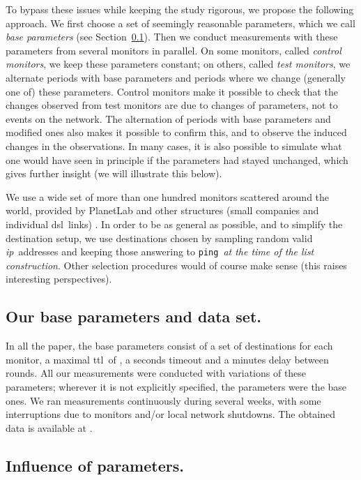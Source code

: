 \documentclass[times, 10pt,twocolumn]{article}
\newcommand{\ping}{{\tt ping}}
\newcommand{\ip}{\mbox{\em \sc ip}}
\newcommand{\ttl}{\mbox{\sc ttl}}
\newcommand{\dsl}{\mbox{\sc dsl}}
\begin{document}
To bypass these issues while keeping the study rigorous, we propose
the following approach. We first choose a set of seemingly reasonable
parameters, which we call {\em base parameters} (see
Section~\ref{sec_base}). Then we conduct measurements with these
parameters from several monitors in parallel.
On some monitors,
called {\em control monitors}, we keep these parameters constant;
on others, called {\em test monitors}, we alternate periods with base
parameters and periods where we change (generally one of) these
parameters.
Control monitors make it possible to check
that the changes observed from test monitors are due to changes of
parameters, not to events on the network. The alternation of periods
with base parameters and modified ones also makes it possible to
confirm this, and to observe the induced changes in the observations.
In many cases, it is also possible to simulate what one would have
seen in principle if the parameters had stayed unchanged, which gives
further insight (we will illustrate this below).

We use a wide set of more than one hundred monitors scattered around
the world, provided by PlanetLab \cite{planetLab} and other structures
(small companies and individual \dsl\ links) \cite{radarurl}.  In
order to be as general as possible, and to simplify the destination
setup, we use destinations chosen by sampling random valid \ip\
addresses and keeping those answering to \ping\ {\em at the time of
  the list construction}. Other selection procedures would of course
make sense (this raises interesting perspectives).



\subsection{Our base parameters and data set.}
\label{sec_base}

In all the paper, the base parameters consist of a set of  destinations for each monitor, a maximal \ttl\ of , a  seconds timeout and a  minutes delay between rounds. All our measurements were conducted with variations of these parameters; wherever it is not explicitly specified, the parameters were the base ones. We ran measurements continuously during several weeks, with some interruptions due to monitors and/or local network shutdowns.
The obtained data is available at \cite{radarurl}.


\subsection{Influence of parameters.}
\label{sec_influence}
\end{document}

